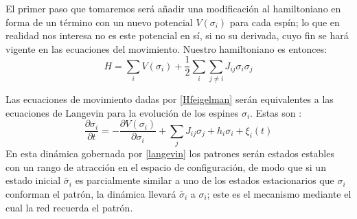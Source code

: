 \documentclass[titlepage,12pt]{article}
\numberwithin{equation}{section}
\begin{document}
	El primer paso que tomaremos será añadir una modificación al hamiltoniano en forma de un término con un nuevo potencial $V(\sigma_i)$ para cada espín; lo que en realidad nos interesa no es este potencial en sí, si no su derivada, cuyo fin se hará vigente en las ecuaciones del movimiento. Nuestro hamiltoniano es entonces:
	\begin{equation}
	H = \sum_i V(\sigma_i) + \frac{1}{2}\sum_{i}\sum_{j\neq i}J_{ij}\sigma_i\sigma_j
	\label{Hfeigelman}
	\end{equation}
	
	Las ecuaciones de movimiento dadas por \eqref{Hfeigelman} serán equivalentes a las ecuaciones de Langevin para la evolución de los espines $\sigma_i$. Estas son \cite{feigelman86}:
	\begin{equation}
	\frac{\partial\sigma_i}{\partial t} = -\frac{\partial V(\sigma_i)}{\partial\sigma_i} + \sum_j J_{ij}\sigma_j + h_i\sigma_i + \xi_i(t)
	\label{langevin}
	\end{equation}
	En esta dinámica gobernada por \eqref{langevin} los patrones serán estados estables con un rango de atracción en el espacio de configuración, de modo que si un estado inicial $\tilde{\sigma_i}$ es parcialmente similar a uno de los estados estacionarios que $\sigma_i$ conforman el patrón, la dinámica llevará $\tilde{\sigma_i}$ a $\sigma_i$; este es el mecanismo mediante el cual la red recuerda el patrón.\\
	
\end{document}
